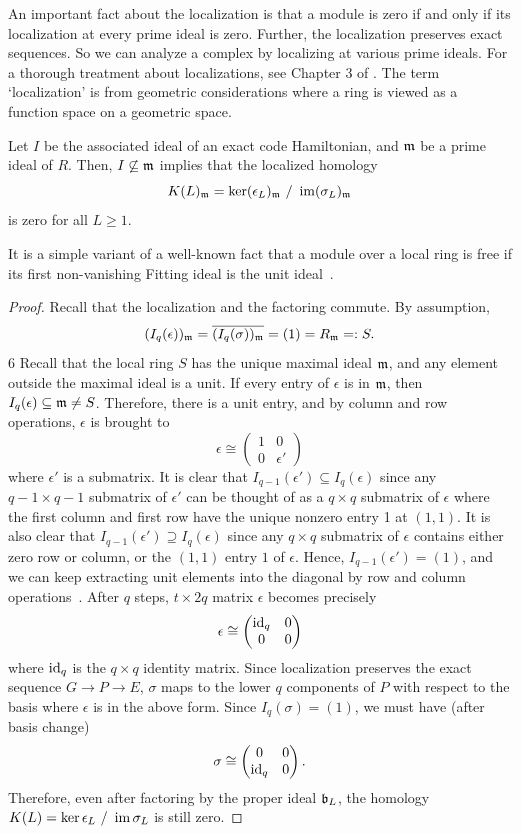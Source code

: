An important fact about the localization is that a module is zero
if and only if its localization at every prime ideal is zero.
Further, the localization preserves exact sequences.
So we can analyze a complex by localizing at various prime ideals.
For a thorough treatment about localizations,
see Chapter 3 of \cite{AtiyahMacDonald}.
The term `localization' is from geometric considerations
where a ring is viewed as a function space on a geometric space.


\begin{lem}
Let $I$ be the associated ideal of an exact code Hamiltonian,
and $\mathfrak{m}$ be a prime ideal of $R$.
Then, $I \not\subseteq \mathfrak{m}$ implies that the localized homology
\[
K(L)_{\mathfrak{m}} = \ker (\epsilon_L)_{\mathfrak{m}} ~/~ \mathop{\mathrm{im}}\nolimits (\sigma_L)_{\mathfrak{m}}
\]
is zero for all $L \ge 1$.
\label{lem:associated-maximal-localized-homology}
\end{lem}
It is a simple variant of a well-known fact that
a module over a local ring is free if its first non-vanishing Fitting ideal is the unit ideal~\cite[Chapter~1 Theorem~12]{Northcott}.
\begin{proof}
Recall that the localization and the factoring commute.
By assumption, 
\[
(I_q(\epsilon))_{\mathfrak{m}} = \overline{ (I_q(\sigma))_{\mathfrak{m}} } = (1) = R_{\mathfrak{m}} =: S.
\]6
Recall that the local ring $S$ has the unique maximal ideal $\mathfrak{m}$,
and any element outside the maximal ideal is a unit.
If every entry of $\epsilon$ is in $\mathfrak{m}$, then $I_q(\epsilon) \subseteq \mathfrak{m} \ne S$.
Therefore, there is a unit entry, and by column and row operations,
$\epsilon$ is brought to
\[
 \epsilon \cong 
\begin{pmatrix}
 1 & 0 \\
 0 & \epsilon'
\end{pmatrix}
\]
where $\epsilon'$ is a submatrix.
It is clear that $I_{q-1}(\epsilon') \subseteq I_q(\epsilon)$
since any $q-1 \times q-1$ submatrix of $\epsilon'$ can be thought of
as a $q \times q$ submatrix of $\epsilon$ where the first column and first row
have the unique nonzero entry 1 at $(1,1)$.
It is also clear that $I_{q-1}(\epsilon') \supseteq I_q(\epsilon)$
since any $q \times q$ submatrix of $\epsilon$ contains
either zero row or column, or the $(1,1)$ entry $1$ of $\epsilon$.
Hence, $I_{q-1}(\epsilon') = (1)$, and
we can keep extracting unit elements
into the diagonal by row and column operations~\cite[Chapter~1 Theorem~12]{Northcott}.
After $q$ steps,
$t \times 2q$ matrix $\epsilon$ becomes precisely
\[
\epsilon \cong 
\begin{pmatrix}
 \mathrm{id}_q & 0 \\
 0 & 0
\end{pmatrix}
\]
where $\mathrm{id}_q$ is the $q \times q$ identity matrix.
Since localization preserves the exact sequence $G \to P \to E$,
$\sigma$ maps to the lower $q$ components of $P$ with respect to the basis
where $\epsilon$ is in the above form.
Since $I_q(\sigma) = (1)$, we must have (after basis change)
\[
\sigma \cong 
\begin{pmatrix}
 0 & 0 \\
 \mathrm{id}_q & 0
\end{pmatrix}.
\]
Therefore, even after factoring by the proper ideal $\mathfrak{b}_L$, 
the homology $K(L) = \ker \epsilon_L ~/~ \mathop{\mathrm{im}}\nolimits \sigma_L$ is still zero.
\end{proof}
